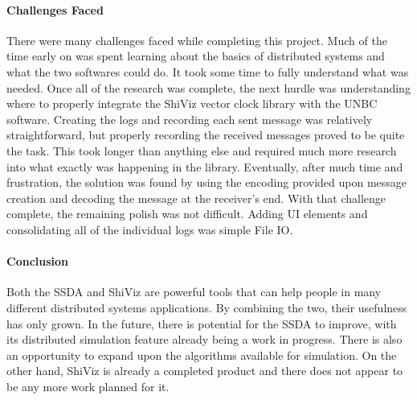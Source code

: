 \documentclass[12pt, oneside]{article}   	%
\begin{document}
\paragraph{Challenges Faced}

There were many challenges faced while completing this project.  Much of the time early on was spent learning about the basics of distributed systems and what the two softwares could do.  It took some time to fully understand what was needed.  Once all of the research was complete, the next hurdle was understanding where to properly integrate the ShiViz vector clock library with the UNBC software.  Creating the logs and recording each sent message was relatively straightforward, but properly recording the received messages proved to be quite the task.  This took longer than anything else and required much more research into what exactly was happening in the library.  Eventually, after much time and frustration, the solution was found by using the encoding provided upon message creation and decoding the message at the receiver's end.  With that challenge complete, the remaining polish was not difficult.  Adding UI elements and consolidating all of the individual logs was simple File IO.

\paragraph{Conclusion}

Both the SSDA and ShiViz are powerful tools that can help people in many different distributed systems applications.  By combining the two, their usefulness has only grown.  In the future, there is potential for the SSDA to improve, with its distributed simulation feature already being a work in progress.  There is also an opportunity to expand upon the algorithms available for simulation.  On the other hand, ShiViz is already a completed product and there does not appear to be any more work planned for it\cite{ShiViz}.
\newpage


\end{document}
